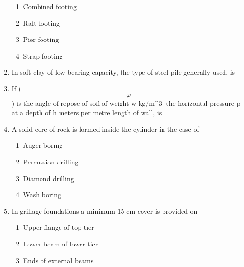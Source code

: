 \documentclass[11pt,a4paper]{article}
\begin{document}
\begin{enumerate}
\begin{enumerate}[label=\Alph*.]
\item{Combined footing}
\item{Raft footing}
\item{Pier footing}
\item{Strap footing}
\end{enumerate}
\item{In soft clay of low bearing capacity, the type of steel pile generally used, is}
\\
\item{If ($$\varphi $$) is the angle of repose of soil of weight w kg/m\^{}3, the horizontal pressure p at a depth of h meters per metre length of wall, is
}
\\
\item{A solid core of rock is formed inside the cylinder in the case of}
\begin{enumerate}[label=\Alph*.]
\item{Auger boring}
\item{Percussion drilling}
\item{Diamond drilling}
\item{Wash boring}
\end{enumerate}
\item{In grillage foundations a minimum 15 cm cover is provided on}
\begin{enumerate}[label=\Alph*.]
\item{Upper flange of top tier}
\item{Lower beam of lower tier}
\item{Ends of external beams}

\end{enumerate}
\end{enumerate}
\end{document}
